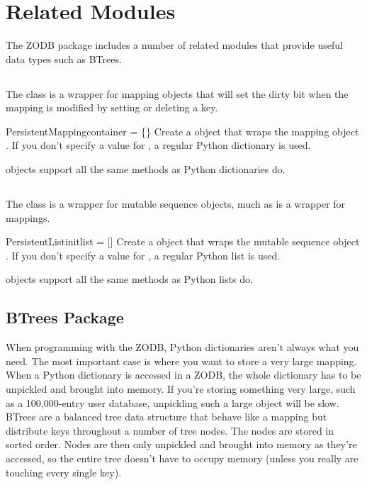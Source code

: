 

\section{Related Modules}

The ZODB package includes a number of related modules that provide
useful data types such as BTrees.

\subsection{}

The  class is a wrapper for mapping objects
that will set the dirty bit when the mapping is modified by setting or
deleting a key.

\begin{funcdesc}{PersistentMapping}{container = \{\}}
Create a  object that wraps the
mapping object .  If you don't specify a
value for , a regular Python dictionary is used.
\end{funcdesc}

 objects support all the same methods as
Python dictionaries do.

\subsection{}

The  class is a wrapper for mutable sequence objects,
much as  is a wrapper for mappings.

\begin{funcdesc}{PersistentList}{initlist = []}
Create a  object that wraps the
mutable sequence object .  If you don't specify a
value for , a regular Python list is used.
\end{funcdesc}

 objects support all the same methods as
Python lists do.


\subsection{BTrees Package}

When programming with the ZODB, Python dictionaries aren't always what
you need.  The most important case is where you want to store a very
large mapping.  When a Python dictionary is accessed in a ZODB, the
whole dictionary has to be unpickled and brought into memory.  If
you're storing something very large, such as a 100,000-entry user
database, unpickling such a large object will be slow.  BTrees are a
balanced tree data structure that behave like a mapping but distribute
keys throughout a number of tree nodes.  The nodes are stored in
sorted order.  Nodes are then only unpickled and brought into memory
as they're accessed, so the entire tree doesn't have to occupy memory
(unless you really are touching every single key).

